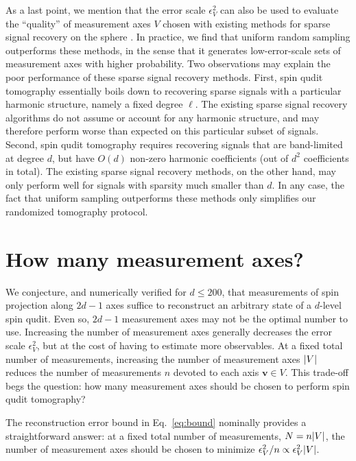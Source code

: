 \documentclass[notitlepage,twocolumn]{revtex4-2}
\renewcommand{\v}{\bm} %
\begin{document}
As a last point, we mention that the error scale $\epsilon_V^2$ can also be used to evaluate the ``quality'' of measurement axes $V$ chosen with existing methods for sparse signal recovery on the sphere \cite{rauhut2011sparse, alem2012sparse}.
In practice, we find that uniform random sampling outperforms these methods, in the sense that it generates low-error-scale sets of measurement axes with higher probability.
Two observations may explain the poor performance of these sparse signal recovery methods.
First, spin qudit tomography essentially boils down to recovering sparse signals with a particular harmonic structure, namely a fixed degree $\ell$.
The existing sparse signal recovery algorithms do not assume or account for any harmonic structure, and may therefore perform worse than expected on this particular subset of signals.
Second, spin qudit tomography requires recovering signals that are band-limited at degree $d$, but have $O(d)$ non-zero harmonic coefficients (out of $d^2$ coefficients in total).
The existing sparse signal recovery methods, on the other hand, may only perform well for signals with sparsity much smaller than $d$.
In any case, the fact that uniform sampling outperforms these methods only simplifies our randomized tomography protocol.

\section{How many measurement axes?}
\label{sec:axes}

We conjecture, and numerically verified for $d\le200$, that measurements of spin projection along $2d-1$ axes suffice to reconstruct an arbitrary state of a $d$-level spin qudit.
Even so, $2d-1$ measurement axes may not be the optimal number to use.
Increasing the number of measurement axes generally decreases the error scale $\epsilon_V^2$, but at the cost of having to estimate more observables.
At a fixed total number of measurements, increasing the number of measurement axes $\abs{V}$ reduces the number of measurements $n$ devoted to each axis $\v v\in V$.
This trade-off begs the question: how many measurement axes should be chosen to perform spin qudit tomography?

The reconstruction error bound in Eq.~\eqref{eq:bound} nominally provides a straightforward answer: at a fixed total number of measurements, $N=n\abs{V}$, the number of measurement axes should be chosen to minimize $\epsilon_V^2/n\propto\epsilon_V^2\abs{V}$.
\end{document}
